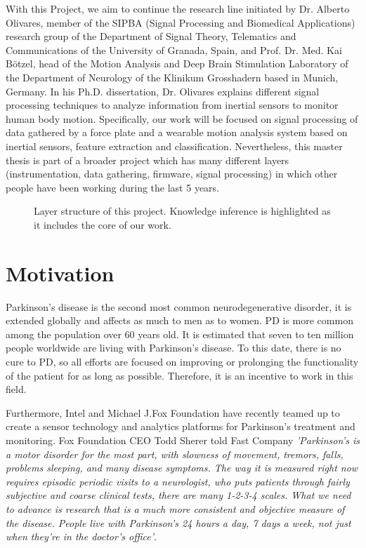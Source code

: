 With this Project, we aim  to continue the research line initiated by Dr. Alberto Olivares, member of the SIPBA (Signal Processing and Biomedical Applications) research group of the Department of Signal Theory, Telematics and Communications of the University of Granada, Spain, and Prof. Dr. Med. Kai Bötzel, head of the Motion Analysis and Deep Brain Stimulation Laboratory of the Department of Neurology of the Klinikum Grosshadern based in Munich, Germany. In his Ph.D. dissertation, Dr. Olivares explains \cite{A.Olivares2013} different signal processing techniques to analyze information from inertial sensors to monitor human body motion.
Specifically, our work will be focused on signal processing of data gathered  by a force plate and a wearable motion analysis system based on inertial sensors, feature extraction and classification. Nevertheless, this master thesis is part of a broader project which has many different layers (instrumentation, data gathering, firmware, signal processing) in which other people have been working during the last 5 years.

 \begin{figure}[H]
 	\centering
 	\caption{Layer structure of this project. Knowledge inference is highlighted as it includes the core of our work.}
 	\label{fig:layer}
 \end{figure}
 \vfill

\section{Motivation}
Parkinson’s disease is the second most common neurodegenerative disorder, it is extended globally and affects as much to men as to women. PD is more common among the population over 60 years old. It is estimated that seven  to ten million people worldwide are living with Parkinson’s disease. To this date, there is no cure to PD, so all efforts are focused on improving or prolonging the functionality of the patient for as long as possible. Therefore, it is an incentive to work in this field\cite{ParkinsonDisease}\cite{pdf}. 

Furthermore, Intel and Michael J.Fox Foundation have recently teamed up to create a sensor technology and analytics platforms for Parkinson’s treatment and monitoring. Fox Foundation CEO Todd Sherer told Fast Company \textit{'Parkinson’s is a motor disorder for the most part, with slowness of movement, tremors, falls, problems sleeping, and many disease symptoms. The way it is measured right now requires episodic periodic visits to a neurologist, who puts patients through fairly subjective and coarse clinical tests, there are many 1-2-3-4 scales. What we need to advance is research that is a much more consistent and objective measure of the disease. People live with Parkinson’s 24 hours a day, 7 days a week, not just when they're in the doctor’s office'}\cite{IntelAndMjf}.

